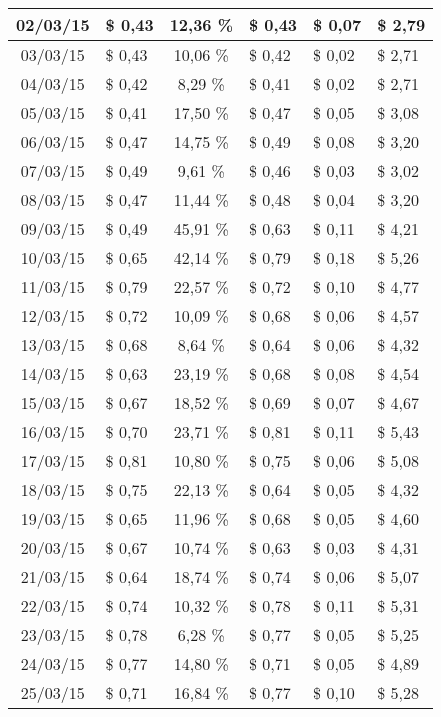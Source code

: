 \begin{center}
\begin{small}
\begin{longtable}{|c|l|c|l|l|l|}
02/03/15 & \$ 0,43 & 12,36 \% & \$ 0,43 & \$ 0,07 & \$ 2,79 \\ \hline
03/03/15 & \$ 0,43 & 10,06 \% & \$ 0,42 & \$ 0,02 & \$ 2,71 \\ \hline
04/03/15 & \$ 0,42 & 8,29 \% & \$ 0,41 & \$ 0,02 & \$ 2,71 \\ \hline
05/03/15 & \$ 0,41 & 17,50 \% & \$ 0,47 & \$ 0,05 & \$ 3,08 \\ \hline
06/03/15 & \$ 0,47 & 14,75 \% & \$ 0,49 & \$ 0,08 & \$ 3,20 \\ \hline
07/03/15 & \$ 0,49 & 9,61 \% & \$ 0,46 & \$ 0,03 & \$ 3,02 \\ \hline
08/03/15 & \$ 0,47 & 11,44 \% & \$ 0,48 & \$ 0,04 & \$ 3,20 \\ \hline
09/03/15 & \$ 0,49 & 45,91 \% & \$ 0,63 & \$ 0,11 & \$ 4,21 \\ \hline
10/03/15 & \$ 0,65 & 42,14 \% & \$ 0,79 & \$ 0,18 & \$ 5,26 \\ \hline
11/03/15 & \$ 0,79 & 22,57 \% & \$ 0,72 & \$ 0,10 & \$ 4,77 \\ \hline
12/03/15 & \$ 0,72 & 10,09 \% & \$ 0,68 & \$ 0,06 & \$ 4,57 \\ \hline
13/03/15 & \$ 0,68 & 8,64 \% & \$ 0,64 & \$ 0,06 & \$ 4,32 \\ \hline
14/03/15 & \$ 0,63 & 23,19 \% & \$ 0,68 & \$ 0,08 & \$ 4,54 \\ \hline
15/03/15 & \$ 0,67 & 18,52 \% & \$ 0,69 & \$ 0,07 & \$ 4,67 \\ \hline
16/03/15 & \$ 0,70 & 23,71 \% & \$ 0,81 & \$ 0,11 & \$ 5,43 \\ \hline
17/03/15 & \$ 0,81 & 10,80 \% & \$ 0,75 & \$ 0,06 & \$ 5,08 \\ \hline
18/03/15 & \$ 0,75 & 22,13 \% & \$ 0,64 & \$ 0,05 & \$ 4,32 \\ \hline
19/03/15 & \$ 0,65 & 11,96 \% & \$ 0,68 & \$ 0,05 & \$ 4,60 \\ \hline
20/03/15 & \$ 0,67 & 10,74 \% & \$ 0,63 & \$ 0,03 & \$ 4,31 \\ \hline
21/03/15 & \$ 0,64 & 18,74 \% & \$ 0,74 & \$ 0,06 & \$ 5,07 \\ \hline
22/03/15 & \$ 0,74 & 10,32 \% & \$ 0,78 & \$ 0,11 & \$ 5,31 \\ \hline
23/03/15 & \$ 0,78 & 6,28 \% & \$ 0,77 & \$ 0,05 & \$ 5,25 \\ \hline
24/03/15 & \$ 0,77 & 14,80 \% & \$ 0,71 & \$ 0,05 & \$ 4,89 \\ \hline
25/03/15 & \$ 0,71 & 16,84 \% & \$ 0,77 & \$ 0,10 & \$ 5,28 \\ \hline

\end{longtable}
\end{small}
\end{center}
